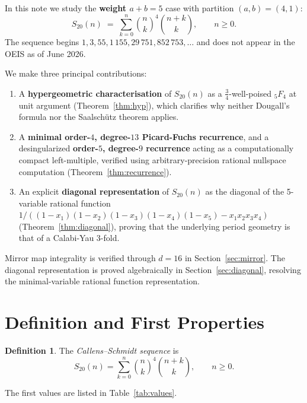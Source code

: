 \documentclass[12pt,reqno]{amsart}
\theoremstyle{plain}
\theoremstyle{definition}
\newtheorem{definition}[theorem]{Definition}
\theoremstyle{remark}
\newcommand{\pFq}[2]{{}_{#1}F_{#2}}
\begin{document}
In this note we study the \textbf{weight $a + b = 5$} case
with partition $(a,b) = (4,1)$:
\begin{equation}\label{eq:S20def}
S_{20}(n) \;=\; \sum_{k=0}^{n} \binom{n}{k}^{\!4}\binom{n+k}{k},
\qquad n \ge 0.
\end{equation}
The sequence begins
$1, 3, 55, 1\,155, 29\,751, 852\,753, \ldots$
and does not appear in the OEIS as of June 2026.

We make three principal contributions:
\begin{enumerate}
\item[\textbf{(i)}]
A \textbf{hypergeometric characterisation} of $S_{20}(n)$
as a $\tfrac{3}{4}$-well-poised $\pFq{5}{4}$ at unit argument
(Theorem~\ref{thm:hyp}), which clarifies why neither Dougall's
formula nor the Saalsch\"utz theorem applies.
\item[\textbf{(ii)}]
A \textbf{minimal order-$4$, degree-$13$ Picard-Fuchs recurrence},
and a desingularized \textbf{order-$5$, degree-$9$ recurrence} acting as a
computationally compact left-multiple, verified using arbitrary-precision rational nullspace computation (Theorem~\ref{thm:recurrence}).
\item[\textbf{(iii)}]
An explicit \textbf{diagonal representation} of $S_{20}(n)$ as the diagonal of the 5-variable rational function $1 / ((1-x_1)(1-x_2)(1-x_3)(1-x_4)(1-x_5) - x_1 x_2 x_3 x_4)$ (Theorem~\ref{thm:diagonal}), proving that the underlying period geometry is that of a Calabi-Yau 3-fold.
\end{enumerate}

Mirror map integrality is verified through $d = 16$ in Section~\ref{sec:mirror}.
The diagonal representation is proved algebraically in Section~\ref{sec:diagonal}, resolving the minimal-variable rational function representation.


\section{Definition and First Properties}\label{sec:def}

\begin{definition}\label{def:S20}
The \emph{Callens--Schmidt sequence} is
\[
S_{20}(n) = \sum_{k=0}^{n} \binom{n}{k}^{\!4}\binom{n+k}{k},
\qquad n \ge 0.
\]
\end{definition}

\noindent
The first values are listed in Table~\ref{tab:values}.
\end{document}
